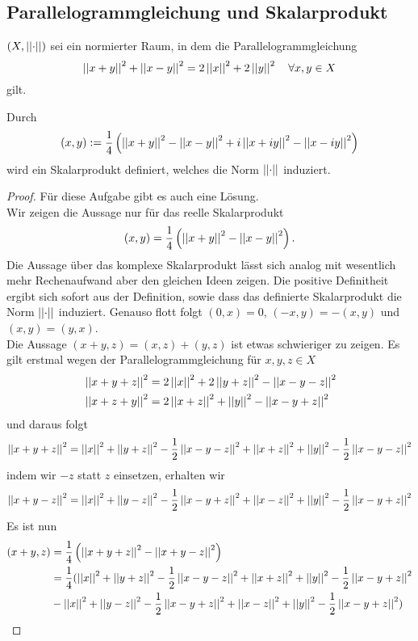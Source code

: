\documentclass[FunkAnaskriptSS2017.tex]{subfiles}
\begin{document}
\subsection{ Parallelogrammgleichung und Skalarprodukt}
\label{B6.1}
	$(X,\norm{\cdot})$ sei ein normierter Raum, in dem die Parallelogrammgleichung 
	$$\norm{x+y}^2 + \norm{x-y}^2 = 2\norm{x}^2 + 2\norm{y}^2\quad \forall x,y \in X$$	
	gilt. 
	\begin{beh}	
	Durch 
	$$(x,y) := \frac{1}{4} \left( \norm{x+y}^2 - \norm{x-y}^2 + i\norm{x+iy}^2 - \norm{x-iy}^2 \right)$$
	wird ein Skalarprodukt definiert, welches die Norm $\norm{\cdot}$ induziert.
	\end{beh}
	\begin{proof}
	Für diese Aufgabe gibt es auch eine Lösung.\\
	Wir zeigen die Aussage nur für das reelle Skalarprodukt 
	$$(x,y) =\frac{1}{4} \left( \norm{x+y}^2 - \norm{x-y}^2 \right).$$
	Die Aussage über das komplexe Skalarprodukt lässt sich analog mit wesentlich mehr Rechenaufwand aber den gleichen Ideen zeigen.
	Die positive Definitheit ergibt sich sofort aus der Definition, sowie dass das definierte Skalarprodukt die Norm $\norm{\cdot}$ induziert. Genauso flott folgt $(0,x) = 0$, $(-x,y) = -(x,y)$ und $(x,y) = (y,x)$. \\
	Die Aussage $(x+y,z)=(x,z)+(y,z)$ ist etwas schwieriger zu zeigen.
	Es gilt erstmal wegen der Parallelogrammgleichung für $x,y,z \in X$
	\begin{equation*}
		\begin{split}
			& \norm{x+y+z}^2 = 2 \norm{x}^2 + 2 \norm{y+z}^2 - \norm{x-y-z}^2\\
			& \norm{x+z+y}^2 = 2 \norm{x+z}^2 + \norm{y}^2 - \norm{x-y+z}^2
		\end{split}
	\end{equation*}
	und daraus folgt 
	$$\norm{x+y+z}^2=\norm{x}^2 + \norm{y+z}^2 - \frac{1}{2}\norm{x-y-z}^2 + \norm{x+z}^2+\norm{y}^2 - \frac{1}{2}\norm{x-y-z}^2$$
	indem wir $-z$ statt $z$ einsetzen, erhalten wir
	$$\norm{x+y-z}^2=\norm{x}^2 + \norm{y-z}^2 - \frac{1}{2}\norm{x-y+z}^2 + \norm{x-z}^2+\norm{y}^2 - \frac{1}{2}\norm{x-y+z}^2$$
	Es ist nun
		\begin{align*}
			 (x+y,z) & = \frac{1}{4}\left(\norm{x+y+z}^2 -\norm{x+y-z}^2 \right) \\
			 & = \frac{1}{4} ( \norm{x}^2  +\norm{y+z}^2 - \frac{1}{2} \norm{x-y-z}^2 +
				\norm{x+z}^2 + \norm{y}^2 - \frac{1}{2} \norm{x-y+z}^2 \\
				& - \norm{x}^2 + \norm{y-z}^2 - \frac{1}{2}\norm{x-y+z}^2 + \norm{x-z}^2+\norm{y}^2 - \frac{1}{2}\norm{x-y+z}^2 ) \\

\end{align*}
\end{proof}
\end{document}
